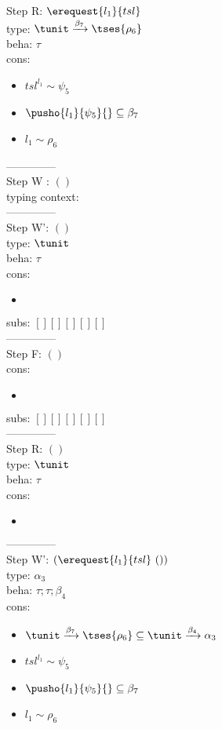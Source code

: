 \documentclass[12pt]{article}
\begin{document}
Step R: $ \erequest{ l_{1} }{tsl} $\\
  type: $ \tunit \xrightarrow{\beta_{7}}  \tses{ \rho_{6}} $ 
\\  beha: $ \tau $ 
\\  cons: \begin{itemize}
\item $ {tsl}^{l_{1}} \sim\psi_{5} $
\item $ \pusho{ l_{1}} {\psi_{5}}{} \subseteq \beta_{7} $
\item $ l_{1} \sim\rho_{6} $
\end{itemize} 
  --------------\\ 
Step W : $ () $\\
 typing context: $ $ 
\\ --------------\\
Step W': $ () $\\
  type: $ \tunit $ 
\\  beha: $ \tau $ 
\\  cons: \begin{itemize}
\item $  $
\end{itemize} 
  subs:  $ [ ] [] [] [] [] $  
 \\--------------\\ 
Step F: $ () $
 \\ cons: \begin{itemize}
\item $  $
\end{itemize}
 subs:  $ [ ] [] [] [] [] $ 
  \\--------------\\ 
Step R: $ () $\\
  type: $ \tunit $ 
\\  beha: $ \tau $ 
\\  cons: \begin{itemize}
\item $  $
\end{itemize} 
  --------------\\ 
Step W': $ (\erequest{ l_{1} }{tsl}~()) $\\
  type: $ \alpha_{3} $ 
\\  beha: $ \tau; \tau; \beta_{4} $ 
\\  cons: \begin{itemize}
\item $ \tunit \xrightarrow{\beta_{7}}  \tses{ \rho_{6}} \subseteq \tunit \xrightarrow{\beta_{4}} \alpha_{3} $
\item $ {tsl}^{l_{1}} \sim\psi_{5} $
\item $ \pusho{ l_{1}} {\psi_{5}}{} \subseteq \beta_{7} $
\item $ l_{1} \sim\rho_{6} $
\end{itemize} 
\end{document}
